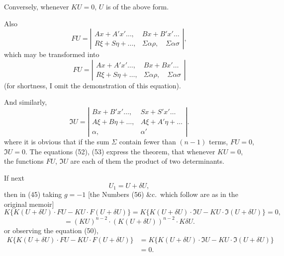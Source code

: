 \documentclass[11pt,a4paper]{article}
\theoremstyle{plain}
\theoremstyle{definition}
\theoremstyle{remark}
\begin{document}
Conversely, whenever $KU=0$, $U$ is of the above form.

Also
\[
FU = \left|\begin{array}{cc}
Ax + A'x' \ldots, & Bx + B'x' \ldots \\
R\xi + S\eta + \ldots, & \Sigma\alpha\rho, \quad \Sigma\alpha\sigma
\end{array}\right|
\tag{50},
\]
which may be transformed into
\[
FU = \left|\begin{array}{cc}
Ax + A'x' \ldots, & Bx + Bx' \ldots \\
R\xi + S\eta + \ldots, & \Sigma\alpha\rho, \quad \Sigma\alpha\sigma
\end{array}\right|
\tag{51}
\]
(for shortness, I omit the demonstration of this equation).

And similarly,
\[
\mathfrak{I}U = \left|\begin{array}{cc}
Bx + B'x' \ldots, & Sx + S'x' \ldots \\
A\xi + B\eta + \ldots, & A\xi + A'\eta + \ldots \\
\alpha, & \alpha'
\end{array}\right|
\tag{52}.
\]
where it is obvious that if the sum $\Sigma$ contain fewer than $(n-1)$ terms, $FU=0$, $\mathfrak{I}U=0$.
The equations (52), (53) express the theorem, that whenever $KU=0$, the functions
$FU$, $\mathfrak{I}U$ are each of them the product of two determinants.

If next
\[
U_1 = U + \delta U,
\]
then in (45) taking $g = -1$ [the Numbers (56) \&c.\ which follow are as in the
original memoir]
\[
K\{K(U+\delta U) \cdot FU - KU \cdot F(U+\delta U)\} = K\{K(U+
\delta U) \cdot \mathfrak{I}U - KU \cdot \mathfrak{I}(U+\delta U)\} = 0 \tag{56},
\]
\[
= (KU)^{n-2} \cdot (K(U+\delta U))^{n-2} \cdot K\delta U.
\]
or observing the equation (50),
\begin{align*}
K\{K(U+\delta U) \cdot FU - KU \cdot F(U+\delta U)\}
&= K\{K(U+\delta U) \cdot \mathfrak{I}U - KU \cdot \mathfrak{I}(U+\delta U)\} \\
&= 0 \tag{57}.
\end{align*}
\end{document}
